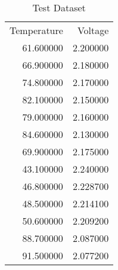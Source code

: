 \begin{table}[H]
\caption{Test Dataset}
\label{tab:temp_voltage}
\begin{tabular}{r|r}
Temperature & Voltage \\
61.600000 & 2.200000 \\
66.900000 & 2.180000 \\
74.800000 & 2.170000 \\
82.100000 & 2.150000 \\
79.000000 & 2.160000 \\
84.600000 & 2.130000 \\
69.900000 & 2.175000 \\
43.100000 & 2.240000 \\
46.800000 & 2.228700 \\
48.500000 & 2.214100 \\
50.600000 & 2.209200 \\
88.700000 & 2.087000 \\
91.500000 & 2.077200 \\
\end{tabular}
\end{table}